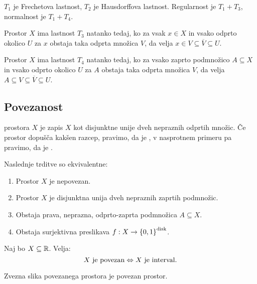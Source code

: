 \begin{opomba}
    $T_1$ je Frechetova lastnost, $T_2$ je Hausdorffova lastnost. Regularnost je $T_1 + T_3$, normalnost je $T_1 + T_4$.
\end{opomba}

\begin{trditev}
    Prostor $X$ ima lastnost $T_3$ natanko tedaj, ko za vsak $x \in X$ in vsako odprto okolico $U$ za $x$ obstaja taka odprta množica $V$, da velja $x \in V \subseteq \overline{V} \subseteq U$.
\end{trditev}

\begin{trditev}
    Prostor $X$ ima lastnost $T_4$ natanko tedaj, ko za vsako zaprto podmnožico $A \subseteq X$ in vsako odprto okolico $U$ za $A$ obstaja taka odprta množica $V$, da velja $A \subseteq V \subseteq \overline{V} \subseteq U$.
\end{trditev}

\subsection{Povezanost}

\begin{definicija}
     prostora $X$ je zapis $X$ kot disjunktne unije dveh nepraznih odprtih množic. Če prostor dopušča kakšen razcep, pravimo, da je , v nasprotnem primeru pa pravimo, da je .
\end{definicija}

\begin{trditev}
    Naslednje trditve so ekvivalentne:
    \begin{enumerate}
        \item Prostor $X$ je nepovezan.
        \item Prostor $X$ je disjunktna unija dveh nepraznih zaprtih podmnožic.
        \item Obstaja prava, neprazna, odprto-zaprta podmnožica $A \subseteq X$.
        \item Obstaja surjektivna preslikava $f: X \to \left\{0,1\right\}^\text{disk}$. 
    \end{enumerate}
\end{trditev}

\begin{izrek}
    Naj bo $X \subseteq \mathbb{R}$. Velja: $$X \text{ je povezan} \Leftrightarrow X \text{ je interval}.$$
\end{izrek}

\begin{izrek}
    Zvezna slika povezanega prostora je povezan prostor.
\end{izrek}

